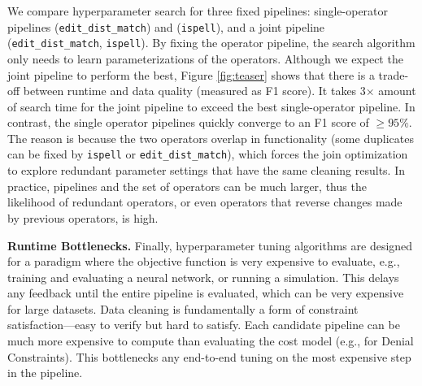 We compare hyperparameter search for three fixed pipelines:  single-operator pipelines (\texttt{edit\_dist\_match}) and (\texttt{ispell}), and a joint pipeline (\texttt{edit\_dist\_match}, \texttt{ispell}).  By fixing the operator pipeline, the search algorithm only needs to learn parameterizations of the operators.  Although we expect the joint pipeline to perform the best, Figure \ref{fig:teaser} shows that there is a trade-off between runtime and data quality (measured as F1 score).  It takes 3$\times$ amount of search time for the joint pipeline to exceed the best single-operator pipeline.    In contrast, the single operator pipelines quickly converge to an F1 score of $\ge95\%$.  The reason is because the two operators overlap in functionality (some duplicates can be fixed by \texttt{ispell} or \texttt{edit\_dist\_match}), which forces the join optimization to explore redundant parameter settings that have the same cleaning results.  In practice, pipelines and the set of operators can be much larger, thus the likelihood of redundant operators, or even operators that reverse changes made by previous operators, is high.


\vspace{0.5em}
\noindent \textbf{Runtime Bottlenecks. } Finally, hyperparameter tuning algorithms are designed for a paradigm where the objective function is very expensive to evaluate, e.g., training and evaluating a neural network, or running a simulation. This delays any feedback until the entire pipeline is evaluated, which can be very expensive for large datasets. Data cleaning is fundamentally a form of constraint satisfaction---easy to verify but hard to satisfy.
Each candidate pipeline can be much more expensive to compute than evaluating the cost model (e.g., for Denial Constraints).  This bottlenecks any end-to-end tuning on the most expensive step in the pipeline.






